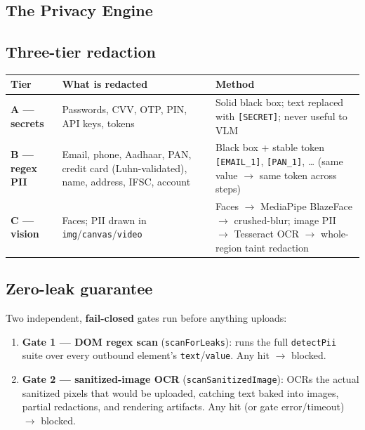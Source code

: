 \documentclass[11pt,a4paper]{article}
\newcommand{\code}[1]{\texttt{#1}}
\renewcommand{\arraystretch}{1.25}
\begin{document}
\begin{itemize}
\section{The Privacy Engine} \label{sec:redaction}

\subsection{Three-tier redaction}

\begin{table}[H]
\small
\renewcommand{\arraystretch}{1.3}
\begin{tabularx}{\linewidth}{@{}p{2.4cm}p{6.3cm}p{3.5cm}@{}}
\toprule
\textbf{Tier} & \textbf{What is redacted} & \textbf{Method} \\
\midrule
\textbf{A --- secrets} & Passwords, CVV, OTP, PIN, API keys, tokens & Solid black box; text replaced with \code{[SECRET]}; never useful to VLM \\
\midrule
\textbf{B --- regex PII} & Email, phone, Aadhaar, PAN, credit card (Luhn-validated), name, address, IFSC, account & Black box + stable token \code{[EMAIL\_1]}, \code{[PAN\_1]}, \ldots{} (same value $\rightarrow$ same token across steps) \\
\midrule
\textbf{C --- vision} & Faces; PII drawn in \code{img}/\code{canvas}/\code{video} & Faces $\rightarrow$ MediaPipe BlazeFace $\rightarrow$ crushed-blur; image PII $\rightarrow$ Tesseract OCR $\rightarrow$ whole-region taint redaction \\
\bottomrule
\end{tabularx}
\end{table}

\subsection{Zero-leak guarantee} \label{sec:zeroleak}

Two independent, \textbf{fail-closed} gates run before anything uploads:

\begin{enumerate}
\item \textbf{Gate 1 --- DOM regex scan} (\code{scanForLeaks}): runs the full \code{detectPii} suite over every outbound element's \code{text}/\code{value}. Any hit $\rightarrow$ blocked.
\item \textbf{Gate 2 --- sanitized-image OCR} (\code{scanSanitizedImage}): OCRs the actual sanitized pixels that would be uploaded, catching text baked into images, partial redactions, and rendering artifacts. Any hit (or gate error/timeout) $\rightarrow$ blocked.
\end{enumerate}


\end{itemize}
\end{document}
